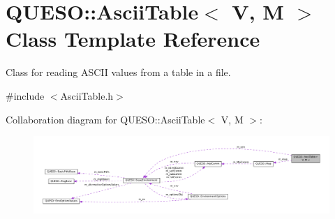 \hypertarget{class_q_u_e_s_o_1_1_ascii_table}{\section{Q\-U\-E\-S\-O\-:\-:Ascii\-Table$<$ V, M $>$ Class Template Reference}
\label{class_q_u_e_s_o_1_1_ascii_table}
}


Class for reading A\-S\-C\-I\-I values from a table in a file.  




{\ttfamily \#include $<$Ascii\-Table.\-h$>$}



Collaboration diagram for Q\-U\-E\-S\-O\-:\-:Ascii\-Table$<$ V, M $>$\-:
\nopagebreak
\begin{figure}[H]
\begin{center}
\leavevmode
\includegraphics[width=350pt]{class_q_u_e_s_o_1_1_ascii_table__coll__graph}
\end{center}
\end{figure}
